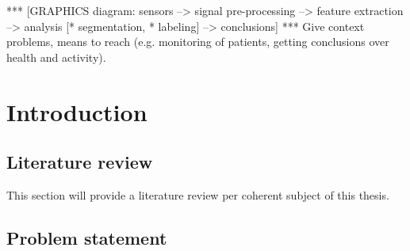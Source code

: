 
*** [GRAPHICS diagram: sensors --> signal pre-processing --> feature extraction --> analysis [* segmentation, * labeling] --> conclusions]
*** Give context problems, means to reach (e.g. monitoring of patients,  getting conclusions over health and activity).
\chapter{Introduction} %
\label{Chapter1} %

\section{Literature review}
This section will provide a literature review per coherent subject of this thesis.

% 





\section{Problem statement}

